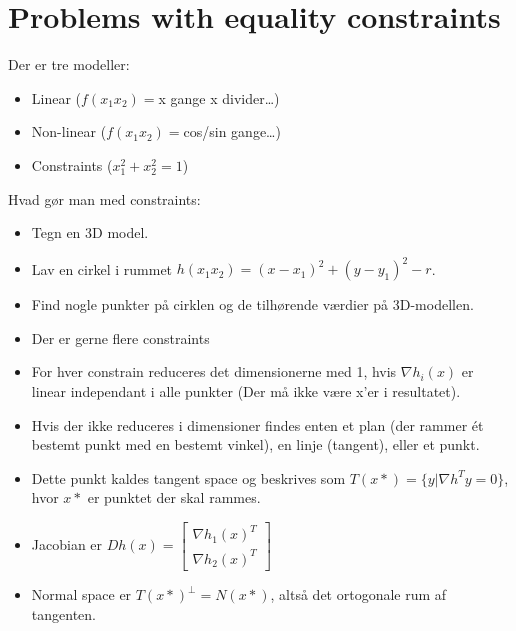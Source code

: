 \documentclass[danish, 10pt]{Memoir}
\begin{document}
\newpage
\section*{Problems with equality constraints}

Der er tre modeller:
\begin{itemize}
	\item Linear ($f(x_1 x_2) = $x gange x divider\dots)
	\item Non-linear ($f(x_1 x_2) = $cos/sin gange\dots)
	\item Constraints ($x_1^2 + x_2^2 = 1$)
\end{itemize}
Hvad gør man med constraints:
\begin{itemize}
	\item Tegn en 3D model.
	\item Lav en cirkel i rummet $h(x_1 x_2) = (x-x_1)^2 + (y-y_1)^2-r$.
	\item Find nogle punkter på cirklen og de tilhørende værdier på 3D-modellen.
	\item Der er gerne flere constraints
	\item For hver constrain reduceres det dimensionerne med 1, hvis $\nabla h_i(x)$ er linear independant i alle punkter (Der må ikke være x'er i resultatet).
	\item Hvis der ikke reduceres i dimensioner findes enten et plan (der rammer ét bestemt punkt med en bestemt vinkel), en linje (tangent), eller et punkt.
	\item Dette punkt kaldes tangent space og beskrives som $T(x*) = \{ y | \nabla h^T y = 0 \}$, hvor $x*$ er punktet der skal rammes.
	\item Jacobian er $Dh(x) = \begin{bmatrix}
	\nabla h_1(x)^T \\ \nabla h_2(x)^T
	\end{bmatrix}$
	\item Normal space er  $T(x*)^\perp = N(x*)$, altså det ortogonale rum af tangenten.
\end{itemize}
\end{document}
